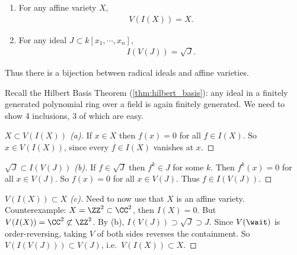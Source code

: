 \begin{theorem}

\envlist

\begin{enumerate}
\def\labelenumi{\alph{enumi}.}
\item
  For any affine variety \(X\),
  \begin{align*}
  V(I(X)) = X
  .\end{align*}
\item
  For any ideal \(J \subset k[x_1, \cdots, x_n]\),
  \begin{align*}
  I(V(J)) = \sqrt{J}
  .\end{align*}
\end{enumerate}

Thus there is a bijection between radical ideals and affine varieties.

\end{theorem}

Recall the Hilbert Basis Theorem (\cref{thm:hilbert_basis}): any ideal
in a finitely generated polynomial ring over a field is again finitely
generated. We need to show 4 inclusions, 3 of which are easy.

\begin{proof}[$X \subset V(I(X))$ (a)]

If \(x\in X\) then \(f(x) = 0\) for all \(f\in I(X)\). So
\(x\in V(I(X))\), since every \(f\in I(X)\) vanishes at \(x\).

\end{proof}

\begin{proof}[$\sqrt{J} \subset I(V(J))$ (b)]

If \(f\in \sqrt{J}\) then \(f^k \in J\) for some \(k\). Then
\(f^k(x) = 0\) for all \(x\in V(J)\). So \(f(x) = 0\) for all
\(x\in V(J)\). Thus \(f\in I(V(J))\).

\end{proof}

\begin{proof}[$V(I(X)) \subset X$ (c)]

Need to now use that \(X\) is an affine variety. Counterexample:
\(X = \ZZ^2 \subset \CC^2\), then \(I(X) = 0\). But
\(V(I(X)) = \CC^2 \not\subset \ZZ^2\). By (b),
\(I(V(J)) \supset \sqrt{J} \supset J\). Since \(V(\wait)\) is
order-reversing, taking \(V\) of both sides reverses the containment. So
\(V(I(V(J))) \subset V(J)\), i.e.~\(V(I(X)) \subset X\).

\end{proof}


